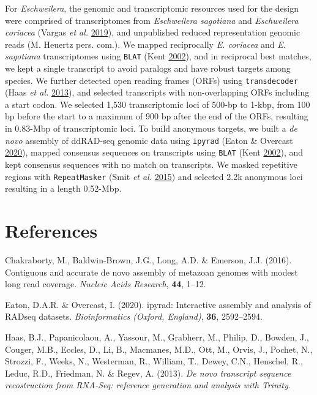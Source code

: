 \documentclass[12pt,]{article}
\begin{document}
For \emph{Eschweilera}, the genomic and transcriptomic resources used for the design were comprised of transcriptomes from \emph{Eschweilera sagotiana} and \emph{Eschweilera coriacea} (Vargas \emph{et al.} \protect\hyperlink{ref-Vargas2019}{2019}), and unpublished reduced representation genomic reads (M. Heuertz pers. com.).
We mapped reciprocally \emph{E. coriacea} and \emph{E. sagotiana} transcriptomes using \texttt{BLAT} (Kent \protect\hyperlink{ref-Kent2002}{2002}), and in reciprocal best matches, we kept a single transcript to avoid paralogs and have robust targets among species.
We further detected open reading frames (ORFs) using \texttt{transdecoder} (Haas \emph{et al.} \protect\hyperlink{ref-Haas2013}{2013}),
and selected transcripts with non-overlapping ORFs including a start codon.
We selected 1,530 transcriptomic loci of 500-bp to 1-kbp, from 100 bp before the start to a maximum of 900 bp after the end of the ORFs, resulting in 0.83-Mbp of transcriptomic loci.
To build anonymous targets, we built a \emph{de novo} assembly of ddRAD-seq genomic data using \texttt{ipyrad} (Eaton \& Overcast \protect\hyperlink{ref-Eaton2020}{2020}), mapped consensus sequences on transcripts using \texttt{BLAT} (Kent \protect\hyperlink{ref-Kent2002}{2002}), and kept consensus sequences with no match on transcripts.
We masked repetitive regions with \texttt{RepeatMasker} (Smit \emph{et al.} \protect\hyperlink{ref-Smit2015}{2015}) and selected 2.2k anonymous loci resulting in a length 0.52-Mbp.

\newpage

\hypertarget{references}{%
\section{References}\label{references}}

\hypertarget{refs}{}
\leavevmode\hypertarget{ref-Chakraborty2016}{}%
Chakraborty, M., Baldwin-Brown, J.G., Long, A.D. \& Emerson, J.J. (2016). Contiguous and accurate de novo assembly of metazoan genomes with modest long read coverage. \emph{Nucleic Acids Research}, \textbf{44}, 1--12.

\leavevmode\hypertarget{ref-Eaton2020}{}%
Eaton, D.A.R. \& Overcast, I. (2020). ipyrad: Interactive assembly and analysis of RADseq datasets. \emph{Bioinformatics (Oxford, England)}, \textbf{36}, 2592--2594.

\leavevmode\hypertarget{ref-Haas2013}{}%
Haas, B.J., Papanicolaou, A., Yassour, M., Grabherr, M., Philip, D., Bowden, J., Couger, M.B., Eccles, D., Li, B., Macmanes, M.D., Ott, M., Orvis, J., Pochet, N., Strozzi, F., Weeks, N., Westerman, R., William, T., Dewey, C.N., Henschel, R., Leduc, R.D., Friedman, N. \& Regev, A. (2013). \emph{De novo transcript sequence recostruction from RNA-Seq: reference generation and analysis with Trinity}.
\end{document}
